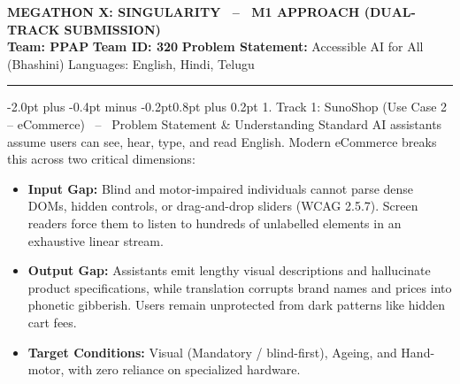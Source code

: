 \documentclass[10pt,a4paper]{article}
\makeatletter
\renewcommand{\section}{\@startsection{section}{1}{\z@}%
  {-2.0pt plus -0.4pt minus -0.2pt}{0.8pt plus 0.2pt}%
  {\normalfont\footnotesize\bfseries\scshape}}
\makeatother
\begin{document}

\begin{center}
  {\normalsize\bfseries MEGATHON X: SINGULARITY \ -- \ M1 APPROACH (DUAL-TRACK SUBMISSION)}\\[0.5pt]
  {\scriptsize\textbf{Team: PPAP} \quad\textbar\quad \textbf{Team ID: 320} \quad\textbar\quad \textbf{Problem Statement:} Accessible AI for All (Bhashini) \quad\textbar\quad Languages: English, Hindi, Telugu}\\[0.5pt]
  \rule{\textwidth}{0.6pt}
\end{center}

\vspace{-4pt}
\noindent{}
\vspace{-2pt}

\section{1. Track 1: SunoShop (Use Case 2 -- eCommerce) \ -- \ Problem Statement \& Understanding}
Standard AI assistants assume users can see, hear, type, and read English. Modern eCommerce breaks this across two critical dimensions:
\begin{itemize}\setlength{\itemsep}{0.2pt}\setlength{\topsep}{0.2pt}\setlength{\leftmargin}{1.1em}
  \item \textbf{Input Gap:} Blind and motor-impaired individuals cannot parse dense DOMs, hidden controls, or drag-and-drop sliders (WCAG 2.5.7). Screen readers force them to listen to hundreds of unlabelled elements in an exhaustive linear stream.
  \item \textbf{Output Gap:} Assistants emit lengthy visual descriptions and hallucinate product specifications, while translation corrupts brand names and prices into phonetic gibberish. Users remain unprotected from dark patterns like hidden cart fees.
  \item \textbf{Target Conditions:} Visual (Mandatory / blind-first), Ageing, and Hand-motor, with zero reliance on specialized hardware.
\end{itemize}
\end{document}
